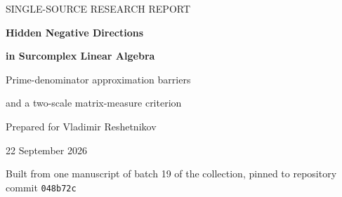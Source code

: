 \documentclass[11pt,oneside]{article}
\theoremstyle{definition}
\theoremstyle{remark}
\newcommand{\C}{\mathbb C}
\begin{document}
\hypersetup{pageanchor=false}
\begin{titlepage}
\centering
\vspace*{2mm}
{\small\sffamily SINGLE-SOURCE RESEARCH REPORT\par}
\vspace{7mm}
{\Huge\bfseries Hidden Negative Directions\par}
\vspace{3mm}
{\Huge\bfseries in Surcomplex Linear Algebra\par}
\vspace{9mm}
{\Large Prime-denominator approximation barriers\par}
\vspace{2mm}
{\Large and a two-scale matrix-measure criterion\par}
\vspace{8mm}
{\large Prepared for Vladimir Reshetnikov\par}
\vspace{2mm}
{22 September 2026\par}
\vspace{1mm}
{\small Built from one manuscript of batch 19 of the collection,
pinned to repository commit \texttt{048b72c}\par}
\vspace{7mm}
\begin{minipage}{0.9\textwidth}
\begin{abstract}
Let $K_\Gamma=\C((t^\Gamma))$, with $\Gamma$ a nonzero divisible ordered
abelian group, and let $\mathscr P_\Gamma$ consist of those Hahn series
whose support lies in a finitely generated additive subgroup of $\Gamma$.
This is an algebraically closed subfield containing every monomial.
Nevertheless, for every $r\ge1$ we construct an explicit Hermitian matrix
of size $r+1$ whose quadratic form is strictly positive at every nonzero
vector with coordinates in $\mathscr P_\Gamma$, and even in its valuation
closure, but which has inertia $(1,r,0)$ over $K_\Gamma$; it is therefore
not positive semidefinite. Throughout, ``positive semidefinite'' means
nonnegative at \emph{every} vector over $K_\Gamma$; statements about a
restricted set of test vectors always name that set.

The construction rests on prime-denominator tails. For
$h=\sum_{p\text{ prime}}t^{\delta(1-1/p)}$, every finite-lattice-supported
approximant differs from $h$ at valuation below $\delta$. Matching its
first $N$ terms by an element algebraic over $\C(t^\delta)$ requires,
and can be achieved with, degree exactly $\prod_{j=1}^N p_j$.
Almost-disjoint prime sets yield continuum many algebraically independent
tails and a uniform linear-combination separation estimate. These results
transport to actual surreal normal forms, including $t=\omega^{-1}$.


\end{abstract}
\end{minipage}
\end{titlepage}
\end{document}
